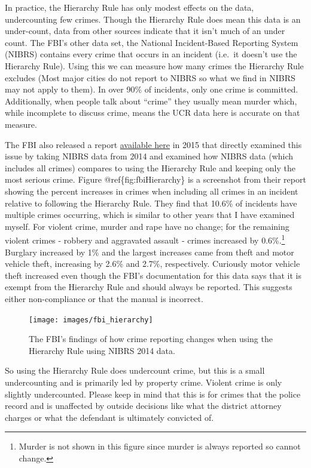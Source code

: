 \documentclass[
  12pt,
  openany]{book}
\begin{document}
In practice, the Hierarchy Rule has only modest effects on the data, undercounting few crimes. Though the Hierarchy Rule does mean this data is an under-count, data from other sources indicate that it isn't much of an under count. The FBI's other data set, the National Incident-Based Reporting System (NIBRS) contains every crime that occurs in an incident (i.e.~it doesn't use the Hierarchy Rule). Using this we can measure how many crimes the Hierarchy Rule excludes (Most major cities do not report to NIBRS so what we find in NIBRS may not apply to them). In over 90\% of incidents, only one crime is committed. Additionally, when people talk about ``crime'' they usually mean murder which, while incomplete to discuss crime, means the UCR data here is accurate on that measure.

The FBI also released a report \href{https://ucr.fbi.gov/nibrs/2014/resource-pages/effects_of_nibrs_on_crime_statistics_final.pdf}{available here} in 2015 that directly examined this issue by taking NIBRS data from 2014 and examined how NIBRS data (which includes all crimes) compares to using the Hierarchy Rule and keeping only the most serious crime. Figure @ref\{fig:fbiHierarchy\} is a screenshot from their report showing the percent increases in crimes when including all crimes in an incident relative to following the Hierarchy Rule. They find that 10.6\% of incidents have multiple crimes occurring, which is similar to other years that I have examined myself. For violent crime, murder and rape have no change; for the remaining violent crimes - robbery and aggravated assault - crimes increased by 0.6\%.\footnote{Murder is not shown in this figure since murder is always reported so cannot change.} Burglary increased by 1\% and the largest increases came from theft and motor vehicle theft, increasing by 2.6\% and 2.7\%, respectively. Curiously motor vehicle theft increased even though the FBI's documentation for this data says that it is exempt from the Hierarchy Rule and should always be reported. This suggests either non-compliance or that the manual is incorrect.

\begin{figure}
\texttt{[image: images/fbi\_hierarchy]} \caption{The FBI's findings of how crime reporting changes when using the Hierarchy Rule using NIBRS 2014 data.}\label{fig:fbiHierarchy}
\end{figure}

So using the Hierarchy Rule does undercount crime, but this is a small undercounting and is primarily led by property crime. Violent crime is only slightly undercounted. Please keep in mind that this is for crimes that the police record and is unaffected by outside decisions like what the district attorney charges or what the defendant is ultimately convicted of.
\end{document}
